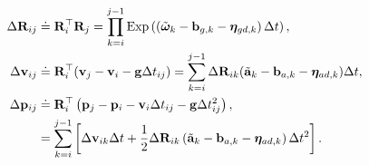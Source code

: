 \begin{subequations}
	\label{eq:def-preintegration}
	\begin{align}
		\Delta \mathbf{R}_{ij} & \buildrel\textstyle.\over= \mathbf{R}_i^\top \mathbf{R}_j = \prod_{k=i}^{j-1} 
		\mathrm{Exp} \left( \left(\tilde{\boldsymbol{\omega}}_k - \mathbf{b}_{g,k} - \boldsymbol{\eta}_{gd, 
			k}\right) \Delta t\right), \\
		\Delta \mathbf{v}_{ij} &\buildrel\textstyle.\over= \mathbf{R}_i^\top(\mathbf{v}_j - \mathbf{v}_i -\mathbf{g} 
		\Delta t_{ij}) = \sum_{k=i}^{j-1} \Delta \mathbf{R}_{ik} (\tilde{\mathbf{a}}_k - \mathbf{b}_{a,k} - 
		\boldsymbol{\eta}_{ad, k}) \Delta t,\\
		\Delta \mathbf{p}_{ij} &\buildrel\textstyle.\over= \mathbf{R}_i^\top \left( \mathbf{p}_j - \mathbf{p}_i - 
		\mathbf{v}_i \Delta t_{ij} - \mathbf{g} \Delta t_{ij}^2 \right), \\
		&= \sum_{k=i}^{j-1} \left[\Delta \mathbf{v}_{ik} \Delta t+\frac{1}{2} \Delta \mathbf{R}_{ik} 
		\left(\tilde{\mathbf{a}}_k - \mathbf{b}_{a,k} - \boldsymbol{\eta}_{ad, k} \right)\Delta t^2 \right].
	\end{align}
\end{subequations}

